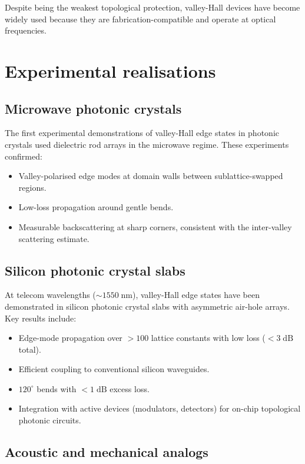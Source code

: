 Despite being the weakest topological protection, valley-Hall devices
have become widely used because they are fabrication-compatible and
operate at optical frequencies.

\section{Experimental realisations}
\label{sec:ch12-experiments}

\subsection{Microwave photonic crystals}
\label{sec:ch12-microwave}

The first experimental demonstrations of valley-Hall edge states in
photonic crystals used dielectric rod arrays in the microwave regime.
These experiments confirmed:
\begin{itemize}
  \item Valley-polarised edge modes at domain walls between
  sublattice-swapped regions.
  \item Low-loss propagation around gentle bends.
  \item Measurable backscattering at sharp corners, consistent with
  the inter-valley scattering estimate.
\end{itemize}

\subsection{Silicon photonic crystal slabs}
\label{sec:ch12-silicon}

At telecom wavelengths ($\sim 1550\;\mathrm{nm}$), valley-Hall edge
states have been demonstrated in silicon photonic crystal slabs with
asymmetric air-hole arrays.  Key results include:
\begin{itemize}
  \item Edge-mode propagation over $>100$ lattice constants with low
  loss ($<3\;\mathrm{dB}$ total).
  \item Efficient coupling to conventional silicon waveguides.
  \item $120^\circ$ bends with $<1\;\mathrm{dB}$ excess loss.
  \item Integration with active devices (modulators, detectors) for
  on-chip topological photonic circuits.
\end{itemize}

\subsection{Acoustic and mechanical analogs}
\label{sec:ch12-acoustic}

